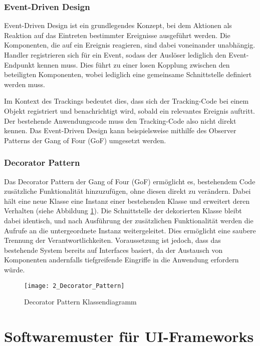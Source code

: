 \subsubsection{Event-Driven Design}
\label{subsubsec:event_driven_design}
Event-Driven Design ist ein grundlegendes Konzept, bei dem Aktionen als Reaktion auf das Eintreten bestimmter Ereignisse ausgeführt werden.  
Die Komponenten, die auf ein Ereignis reagieren, sind dabei voneinander unabhängig.  
Handler registrieren sich für ein Event, sodass der Auslöser lediglich den Event-Endpunkt kennen muss.  
Dies führt zu einer losen Kopplung zwischen den beteiligten Komponenten, wobei lediglich eine gemeinsame Schnittstelle definiert werden muss.  

Im Kontext des Trackings bedeutet dies, dass sich der Tracking-Code bei einem Objekt registriert und benachrichtigt wird, sobald ein relevantes Ereignis auftritt. Der bestehende Anwendungscode muss den Tracking-Code also nicht direkt kennen. Das Event-Driven Design kann beispielsweise mithilfe des Observer Patterns der Gang of Four (GoF) \cite{gamma1995design} umgesetzt werden.

\subsubsection{Decorator Pattern}
Das Decorator Pattern der Gang of Four (GoF) \cite{gamma1995design} ermöglicht es, bestehendem Code zusätzliche Funktionalität hinzuzufügen, ohne diesen direkt zu verändern.  
Dabei hält eine neue Klasse eine Instanz einer bestehenden Klasse und erweitert deren Verhalten (siehe Abbildung \ref{fig:decorator_pattern}). 
Die Schnittstelle der dekorierten Klasse bleibt dabei identisch, und nach Ausführung der zusätzlichen Funktionalität werden die Aufrufe an die untergeordnete Instanz weitergeleitet. Dies ermöglicht eine saubere Trennung der Verantwortlichkeiten. Voraussetzung ist jedoch, dass das bestehende System bereits auf Interfaces basiert, da der Austausch von Komponenten andernfalls tiefgreifende Eingriffe in die Anwendung erfordern würde.

\begin{figure}[H]
\centering
\texttt{[image: 2\_Decorator\_Pattern]}
\caption{Decorator Pattern Klassendiagramm}
\label{fig:decorator_pattern}
\end{figure}

\section{Softwaremuster für UI-Frameworks}
\label{subsec:patterns}

